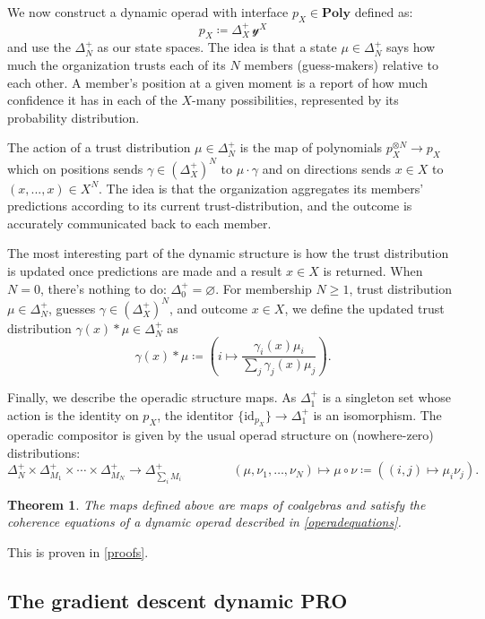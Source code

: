 \documentclass{eptcs}
\theoremstyle{definition}
\theoremstyle{plain}
\newtheorem{theorem}[definitionx]{Theorem}
\newcommand{\Cat}[1]{\textbf{#1}}%
\newcommand{\id}{\mathrm{id}}
\newcommand{\yon}{\mathcal{y}}
\newcommand{\poly}{\Cat{Poly}}
\newcommand{\0}{\textsf{0}}
\newcommand{\1}{\tn{\textsf{1}}}
\newcommand{\bet}{\Delta^+}
\begin{document}
We now construct a dynamic operad with interface $p_X\in\poly$ defined as:
\[
p_X\coloneqq \bet_X\,\yon^X
\]
and use the $\Delta^+_N$ as our state spaces. The idea is that a state $\mu\in\Delta^+_N$ says how much the organization trusts each of its $N$ members (guess-makers) relative to each other. A member's position at a given moment is a report of how much confidence it has in each of the $X$-many possibilities, represented by its probability distribution.

The action of a trust distribution $\mu \in \Delta^+_N$ is the map of polynomials $p_X^{\otimes N} \to p_X$ which on positions sends $\gamma \in (\bet_X)^N$ to $\mu \cdot \gamma$ and on directions sends $x \in X$ to $(x,...,x) \in X^N$. The idea is that the organization aggregates its members' predictions according to its current trust-distribution, and the outcome is accurately communicated back to each member.

The most interesting part of the dynamic structure is how the trust distribution is updated once predictions are made and a result $x\in X$ is returned. When $N=0$, there's nothing to do: $\Delta^+_0=\varnothing$. For membership $N\geq 1$, trust distribution $\mu\in\Delta^+_N$, guesses $\gamma\in(\bet_X)^N$, and outcome $x\in X$, we define the updated trust distribution $\gamma(x) * \mu \in\Delta^+_N$ as
\[
\gamma(x) * \mu \coloneqq \left( i \mapsto \frac{\gamma_i(x)\mu_i}{\sum_j \gamma_j(x)\mu_j}\right).
\]

Finally, we describe the operadic structure maps. As $\Delta^+_1$ is a singleton set whose action is the identity on $p_X$, the identitor $\{\id_{p_X}\} \to \Delta^+_1$ is an isomorphism. The operadic compositor is given by the usual operad structure on (nowhere-zero) distributions:
\[
\Delta^+_N \times \Delta^+_{M_1} \times \cdots \times \Delta^+_{M_N} \to \Delta^+_{\sum_i M_i} \qquad\qquad (\mu,\nu_1,\ldots,\nu_N) \mapsto \mu \circ \nu \coloneqq \left( (i,j) \mapsto \mu_i\nu_j \right).
\]

\begin{theorem}\label{predictionadaptive}
The maps defined above are maps of coalgebras and satisfy the coherence equations of a dynamic operad described in \cref{operadequations}.
\end{theorem}

This is proven in \cref{proofs}.

\subsection{The gradient descent dynamic PRO}
\end{document}
